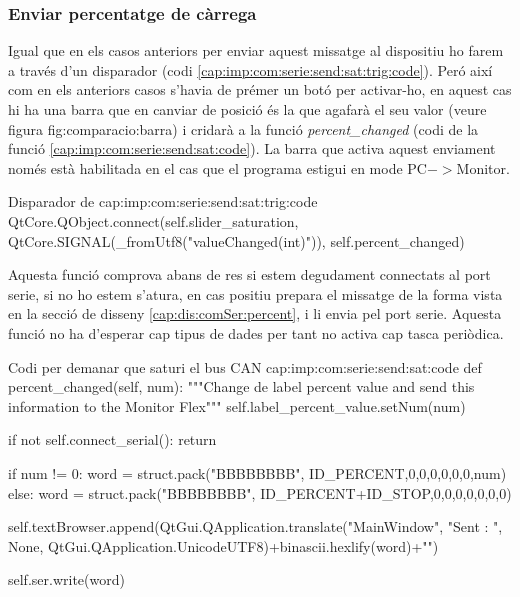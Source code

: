 \subsubsection{Enviar percentatge de càrrega}\label{cap:imp:com:serie:send:sat}

Igual que en els casos anteriors per enviar aquest missatge al dispositiu \Monitor ho farem a través d'un disparador (codi \ref{cap:imp:com:serie:send:sat:trig:code}). Peró així com en els anteriors casos s'havia de prémer un botó per activar-ho, en aquest cas hi ha una barra que en canviar de posició és la que agafarà el seu valor (veure figura {fig:comparacio:barra}) i cridarà a la funció \emph{percent\_changed} (codi de la funció \ref{cap:imp:com:serie:send:sat:code}).
La barra que activa aquest enviament només està habilitada en el cas que el programa \DCSMonitor estigui en mode PC$->$Monitor.

\begin{code_python}{Disparador de }{cap:imp:com:serie:send:sat:trig:code}
QtCore.QObject.connect(self.slider_saturation, QtCore.SIGNAL(_fromUtf8("valueChanged(int)")), self.percent_changed)
\end{code_python}

Aquesta funció comprova abans de res si estem degudament connectats al port serie, si no ho estem s'atura, en cas positiu prepara el missatge de la forma vista en la secció de disseny \ref{cap:dis:comSer:percent}, i li envia pel port serie.
Aquesta funció no ha d'esperar cap tipus de dades per tant no activa cap tasca periòdica.

\begin{code_python}{Codi per demanar que saturi el bus CAN }{cap:imp:com:serie:send:sat:code}
def percent_changed(self, num):
    """Change de label percent value and send this information to the Monitor Flex"""
    self.label_percent_value.setNum(num)
    
    if not self.connect_serial():
            return
    
    if num != 0:
        word = struct.pack("BBBBBBBB", ID_PERCENT,0,0,0,0,0,0,num)
    else:
        word = struct.pack("BBBBBBBB", ID_PERCENT+ID_STOP,0,0,0,0,0,0,0)
    
    self.textBrowser.append(QtGui.QApplication.translate("MainWindow", "Sent : ", None, QtGui.QApplication.UnicodeUTF8)+binascii.hexlify(word)+"\n")
    
    self.ser.write(word)
\end{code_python}


